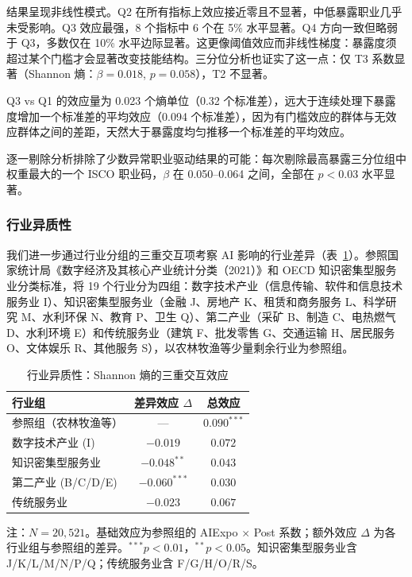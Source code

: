 \documentclass[12pt, a4paper]{article}
\begin{document}
结果呈现非线性模式。Q2 在所有指标上效应接近零且不显著，中低暴露职业几乎未受影响。Q3 效应最强，8 个指标中 6 个在 5\% 水平显著。Q4 方向一致但略弱于 Q3，多数仅在 10\% 水平边际显著。这更像阈值效应而非线性梯度：暴露度须超过某个门槛才会显著改变技能结构。三分位分析也证实了这一点：仅 T3 系数显著（Shannon 熵：$\beta = 0.018$, $p = 0.058$），T2 不显著。

Q3 vs Q1 的效应量为 0.023 个熵单位（0.32 个标准差），远大于连续处理下暴露度增加一个标准差的平均效应（0.094 个标准差），因为有门槛效应的群体与无效应群体之间的差距，天然大于暴露度均匀推移一个标准差的平均效应。

逐一剔除分析排除了少数异常职业驱动结果的可能：每次剔除最高暴露三分位组中权重最大的一个 ISCO 职业码，$\beta$ 在 0.050--0.064 之间，全部在 $p < 0.03$ 水平显著。

\subsubsection{行业异质性}

我们进一步通过行业分组的三重交互项考察 AI 影响的行业差异（表~\ref{tab:industry}）。参照国家统计局《数字经济及其核心产业统计分类（2021）》和 OECD 知识密集型服务业分类标准，将 19 个行业分为四组：数字技术产业（信息传输、软件和信息技术服务业 I）、知识密集型服务业（金融 J、房地产 K、租赁和商务服务 L、科学研究 M、水利环保 N、教育 P、卫生 Q）、第二产业（采矿 B、制造 C、电热燃气 D、水利环境 E）和传统服务业（建筑 F、批发零售 G、交通运输 H、居民服务 O、文体娱乐 R、其他服务 S），以农林牧渔等少量剩余行业为参照组。

\begin{table}[htbp]
\centering
\caption{行业异质性：Shannon 熵的三重交互效应}
\label{tab:industry}
\begin{threeparttable}
\begin{tabular}{lcc}
\toprule
行业组 & 差异效应 $\Delta$ & 总效应 \\
\midrule
参照组（农林牧渔等） & ---                & $0.090^{***}$ \\
数字技术产业 (I)      & $-0.019$           & $0.072$       \\
知识密集型服务业      & $-0.048^{**}$      & $0.043$       \\
第二产业 (B/C/D/E)    & $-0.060^{***}$     & $0.030$       \\
传统服务业            & $-0.023$           & $0.067$       \\
\bottomrule
\end{tabular}
\begin{tablenotes}[flushleft]
\small
\item 注：$N = 20{,}521$。基础效应为参照组的 AIExpo $\times$ Post 系数；额外效应 $\Delta$ 为各行业组与参照组的差异。$^{***}p<0.01$，$^{**}p<0.05$。知识密集型服务业含 J/K/L/M/N/P/Q；传统服务业含 F/G/H/O/R/S。
\end{tablenotes}
\end{threeparttable}
\end{table}
\end{document}
